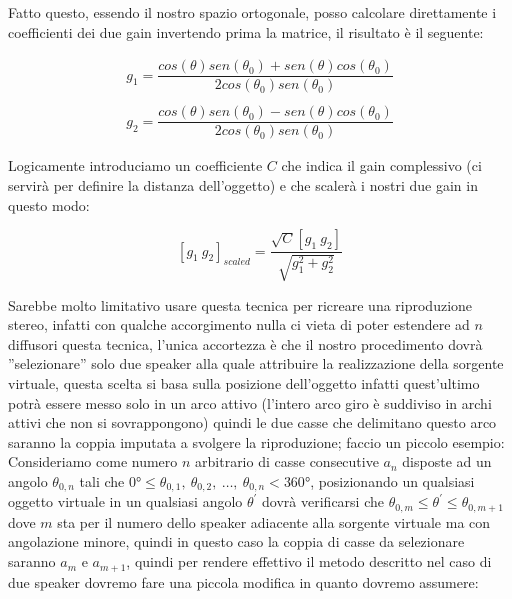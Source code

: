 \documentclass[12pt,a4paper]{report}
\begin{document}
Fatto questo, essendo il nostro spazio ortogonale, posso calcolare direttamente i coefficienti dei due gain invertendo prima la matrice, il risultato è il seguente:

\begin{equation}\begin{split}
g_1=\dfrac{cos(\theta) sen(\theta_0) + sen (\theta) cos(\theta_0)}{2 cos(\theta_0) sen(\theta_0)}\\ \\
g_2=\dfrac{cos(\theta) sen(\theta_0) - sen (\theta) cos(\theta_0)}{2 cos(\theta_0) sen(\theta_0)}
\end{split}
\label{eq:eeee}
\end{equation}

Logicamente introduciamo un coefficiente $C$ che indica il gain complessivo (ci servirà per definire la distanza dell'oggetto) e che scalerà i nostri due gain in questo modo:

\begin{equation}
\left[g_1 \ g_2\right]_{scaled} = \dfrac{\sqrt{C} \left[ g_1 \ g_2 \right]}{\sqrt{g_1^2 + g_2^2}}
\label{eq:ffff}
\end{equation}

Sarebbe molto limitativo usare questa tecnica per ricreare una riproduzione stereo, infatti con qualche accorgimento nulla ci vieta di poter estendere ad $n$ diffusori questa tecnica, l'unica accortezza è che il nostro procedimento dovrà ''selezionare'' solo due speaker alla quale attribuire la realizzazione della sorgente virtuale, questa scelta si basa sulla posizione dell'oggetto infatti quest'ultimo potrà essere messo solo in un arco attivo (l'intero arco giro è suddiviso in archi attivi che non si sovrappongono) quindi le due casse che delimitano questo arco saranno la coppia imputata a svolgere la riproduzione; faccio un piccolo esempio:\\

Consideriamo come numero $n$ arbitrario di casse consecutive $a_n$ disposte ad un angolo $\theta_{0,n}$ tali che $0°\leq \theta_{0,1},\ \theta_{0,2},\ \ldots,\ \theta_{0,n} <360°$, posizionando un qualsiasi oggetto virtuale in un qualsiasi angolo $\theta^{\prime}$ dovrà verificarsi che $\theta_{0,m}\leq \theta^{\prime} \leq \theta_{0,m+1}$ dove $m$ sta per il numero dello speaker adiacente alla sorgente virtuale ma con angolazione minore, quindi in questo caso la coppia di casse da selezionare saranno $a_m$ e $a_{m+1}$, quindi per rendere effettivo il metodo descritto nel caso di due speaker dovremo fare una piccola modifica in quanto dovremo assumere:
\end{document}
